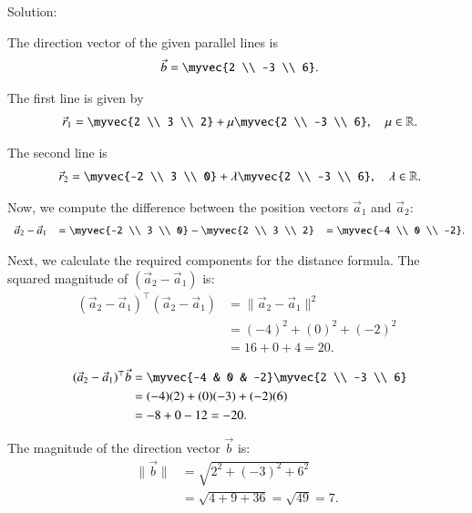 \documentclass{beamer}
\begin{document}
\begin{frame}{Solution:}



The direction vector of the given parallel lines is
\begin{align}
    \vec{b} = \myvec{2 \\ -3 \\ 6}.
\end{align}

The first line is given by
\begin{align}
    \vec{r}_1 = \myvec{2 \\ 3 \\ 2} + \mu \myvec{2 \\ -3 \\ 6}, \quad \mu \in \mathbb{R}.
\end{align}

The second line is
\begin{align}
    \vec{r}_2 = \myvec{-2 \\ 3 \\ 0} + \lambda \myvec{2 \\ -3 \\ 6}, \quad \lambda \in \mathbb{R}.
\end{align}
\end{frame}
\begin{frame}
Now, we compute the difference between the position vectors $\vec{a}_1$ and $\vec{a}_2$:
\begin{align}
    \vec{a}_2 - \vec{a}_1 
    = \myvec{-2 \\ 3 \\ 0} - \myvec{2 \\ 3 \\ 2} 
    = \myvec{-4 \\ 0 \\ -2}.
\end{align}

Next, we calculate the required components for the distance formula.
The squared magnitude of $(\vec{a}_2 - \vec{a}_1)$ is:
\begin{align}
    (\vec{a}_2 - \vec{a}_1)^\top (\vec{a}_2 - \vec{a}_1) &= \lVert \vec{a}_2 - \vec{a}_1 \rVert^2 \\
    &= (-4)^2 + (0)^2 + (-2)^2 \\
    &= 16 + 0 + 4 = 20.
\end{align}
\end{frame}
\begin{frame}

\begin{align}
    (\vec{a}_2 - \vec{a}_1)^\top \vec{b} &= \myvec{-4 & 0 & -2} \myvec{2 \\ -3 \\ 6} \\
    &= (-4)(2) + (0)(-3) + (-2)(6) \\
    &= -8 + 0 - 12 = -20.
\end{align}

The magnitude of the direction vector $\vec{b}$ is:
\begin{align}
    \lVert \vec{b} \rVert &= \sqrt{2^2 + (-3)^2 + 6^2} \\
    &= \sqrt{4 + 9 + 36} = \sqrt{49} = 7.
\end{align}
\end{frame}
\end{document}
